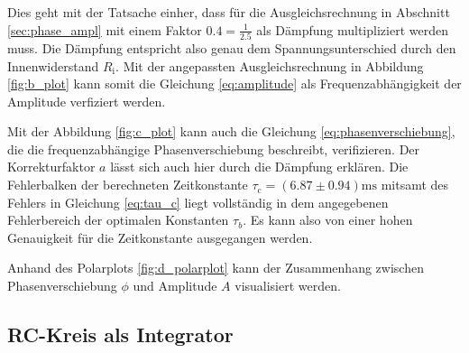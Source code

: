 \noindent
Dies geht mit der Tatsache einher, dass für die Ausgleichsrechnung in Abschnitt \ref{sec:phase_ampl} mit einem Faktor 
$\num{0.4} = \frac{1}{\num{2.5}}$ als Dämpfung multipliziert werden muss.
Die Dämpfung entspricht also genau dem Spannungsunterschied durch den Innenwiderstand $R_\text{i}$.
Mit der angepassten Ausgleichsrechnung in Abbildung \ref{fig:b_plot} kann somit die Gleichung \eqref{eq:amplitude} 
als Frequenzabhängigkeit der Amplitude verfiziert werden.

\noindent
Mit der Abbildung \ref{fig:c_plot} kann auch die Gleichung \eqref{eq:phasenverschiebung}, die die frequenzabhängige Phasenverschiebung 
beschreibt, verifizieren.
Der Korrekturfaktor $a$ lässt sich auch hier durch die Dämpfung erklären.
Die Fehlerbalken der berechneten Zeitkonstante $\tau_\text{c} = (\num{6.87} \pm \num{0.94}) \unit{\milli\s}$ mitsamt des Fehlers
in Gleichung \eqref{eq:tau_c} liegt vollständig in dem angegebenen Fehlerbereich der optimalen Konstanten $\tau_b$.
Es kann also von einer hohen Genauigkeit für die Zeitkonstante ausgegangen werden.

\noindent
Anhand des Polarplots \ref{fig:d_polarplot} kann der Zusammenhang zwischen Phasenverschiebung $\phi$ und Amplitude $A$ visualisiert werden.




\subsection{RC-Kreis als Integrator}

